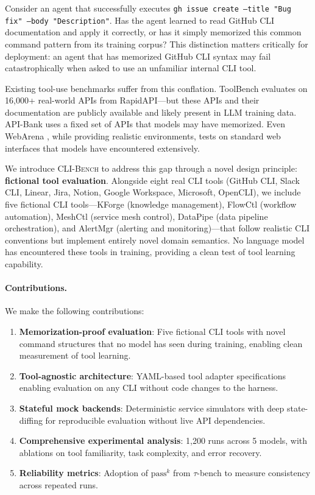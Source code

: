 \documentclass{article}
\newcommand{\clibench}{\textsc{CLI-Bench}}
\newcommand{\passmark}{\text{pass}^k}
\begin{document}
Consider an agent that successfully executes \texttt{gh issue create --title "Bug fix" --body "Description"}. Has the agent learned to read GitHub CLI documentation and apply it correctly, or has it simply memorized this common command pattern from its training corpus? This distinction matters critically for deployment: an agent that has memorized GitHub CLI syntax may fail catastrophically when asked to use an unfamiliar internal CLI tool.

Existing tool-use benchmarks suffer from this conflation. ToolBench \citep{toolbench2023} evaluates on 16,000+ real-world APIs from RapidAPI---but these APIs and their documentation are publicly available and likely present in LLM training data. API-Bank \citep{api-bank2023} uses a fixed set of APIs that models may have memorized. Even WebArena \citep{webarena2023}, while providing realistic environments, tests on standard web interfaces that models have encountered extensively.

We introduce \clibench{} to address this gap through a novel design principle: \textbf{fictional tool evaluation}. Alongside eight real CLI tools (GitHub CLI, Slack CLI, Linear, Jira, Notion, Google Workspace, Microsoft, OpenCLI), we include five fictional CLI tools---KForge (knowledge management), FlowCtl (workflow automation), MeshCtl (service mesh control), DataPipe (data pipeline orchestration), and AlertMgr (alerting and monitoring)---that follow realistic CLI conventions but implement entirely novel domain semantics. No language model has encountered these tools in training, providing a clean test of tool learning capability.

\paragraph{Contributions.} We make the following contributions:
\begin{enumerate}[leftmargin=*, itemsep=2pt, topsep=2pt]
    \item \textbf{Memorization-proof evaluation}: Five fictional CLI tools with novel command structures that no model has seen during training, enabling clean measurement of tool learning.
    \item \textbf{Tool-agnostic architecture}: YAML-based tool adapter specifications enabling evaluation on any CLI without code changes to the harness.
    \item \textbf{Stateful mock backends}: Deterministic service simulators with deep state-diffing for reproducible evaluation without live API dependencies.
    \item \textbf{Comprehensive experimental analysis}: 1,200 runs across 5 models, with ablations on tool familiarity, task complexity, and error recovery.
    \item \textbf{Reliability metrics}: Adoption of $\passmark$ from $\tau$-bench \citep{taubench2024} to measure consistency across repeated runs.
\end{enumerate}
\end{document}
